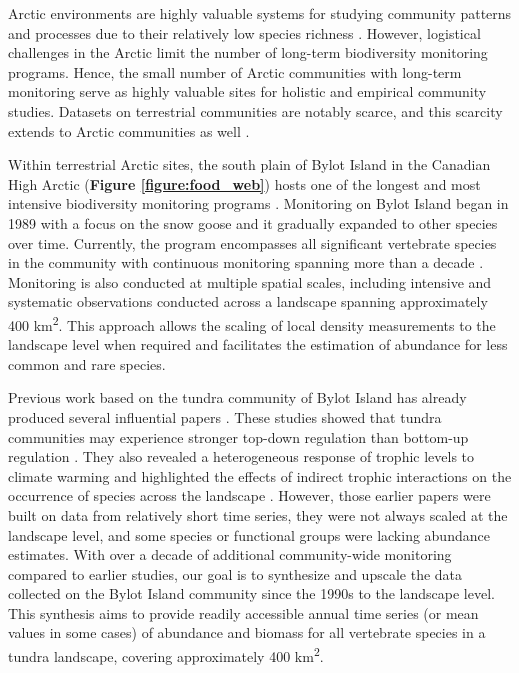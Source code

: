 \documentclass[a4paper,twoside,10pt]{article}
\begin{document}
Arctic environments are highly valuable systems for studying community patterns and processes due to their relatively low species richness \citep{payer2013, legagneux2014}. However, logistical challenges in the Arctic limit the number of long-term biodiversity monitoring programs. Hence, the small number of Arctic communities with long-term monitoring serve as highly valuable sites for holistic and empirical community studies. Datasets on terrestrial communities are notably scarce, and this scarcity extends to Arctic communities as well \citep{ims2013}. 

Within terrestrial Arctic sites, the south plain of Bylot Island in the Canadian High Arctic (\textbf{Figure \ref{figure:food_web}}) hosts one of the longest and most intensive biodiversity monitoring programs \citep{gauthier2024a}. Monitoring on Bylot Island began in 1989 with a focus on the snow goose and it gradually expanded to other species over time. Currently, the program encompasses all significant vertebrate species in the community with continuous monitoring spanning more than a decade \citep{gauthier2024a}. Monitoring is also conducted at multiple spatial scales, including intensive and systematic observations conducted across a landscape spanning approximately 400 km\textsuperscript{2}. This approach allows the scaling of local density measurements to the landscape level when required and facilitates the estimation of abundance for less common and rare species. 

Previous work based on the tundra community of Bylot Island  has already produced several influential papers \citep{gauthier2011, legagneux2012, legagneux2014,hutchison2020, duchesne2021, gauthier2024b}. These studies showed that tundra communities may experience stronger top-down regulation than bottom-up regulation \citep{legagneux2012, legagneux2014}. They also revealed a heterogeneous response of trophic levels to climate warming \citep{gauthier2013} and highlighted the effects of indirect trophic interactions on the occurrence of species across the landscape \citep{duchesne2021}. However, those earlier papers were built on data from relatively short time series, they were not always scaled at the landscape level, and some species or functional groups were lacking abundance estimates. With over a decade of additional community-wide monitoring compared to earlier studies, our goal is to synthesize and upscale the data collected on the Bylot Island community since the 1990s to the landscape level. This synthesis aims to provide readily accessible annual time series (or mean values in some cases) of abundance and biomass for all vertebrate species in a tundra landscape, covering approximately 400 km\textsuperscript{2}. 
\end{document}
